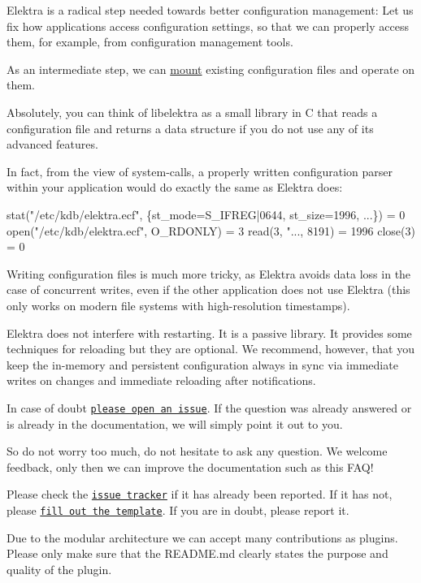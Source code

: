 Elektra is a radical step needed towards better configuration management\+: Let us fix how applications access configuration settings, so that we can properly access them, for example, from configuration management tools.

As an intermediate step, we can \hyperlink{doc_help_elektra-mounting_md}{mount} existing configuration files and operate on them.

Absolutely, you can think of libelektra as a small library in C that reads a configuration file and returns a data structure if you do not use any of its advanced features.

In fact, from the view of system-\/calls, a properly written configuration parser within your application would do exactly the same as Elektra does\+:


\begin{DoxyCode}
stat("/etc/kdb/elektra.ecf", \{st\_mode=S\_IFREG|0644, st\_size=1996, ...\}) = 0
open("/etc/kdb/elektra.ecf", O\_RDONLY)  = 3
read(3, "..., 8191) = 1996
close(3)                                = 0
\end{DoxyCode}


Writing configuration files is much more tricky, as Elektra avoids data loss in the case of concurrent writes, even if the other application does not use Elektra (this only works on modern file systems with high-\/resolution timestamps).

Elektra does not interfere with restarting. It is a passive library. It provides some techniques for reloading but they are optional. We recommend, however, that you keep the in-\/memory and persistent configuration always in sync via immediate writes on changes and immediate reloading after notifications.

In case of doubt \href{https://git.libelektra.org/issues}{\tt please open an issue}. If the question was already answered or is already in the documentation, we will simply point it out to you.

So do not worry too much, do not hesitate to ask any question. We welcome feedback, only then we can improve the documentation such as this F\+A\+Q!

Please check the \href{https://git.libelektra.org/issues}{\tt issue tracker} if it has already been reported. If it has not, please \href{https://git.libelektra.org/issues/new}{\tt fill out the template}. If you are in doubt, please report it.

Due to the modular architecture we can accept many contributions as plugins. Please only make sure that the R\+E\+A\+D\+M\+E.\+md clearly states the purpose and quality of the plugin.

